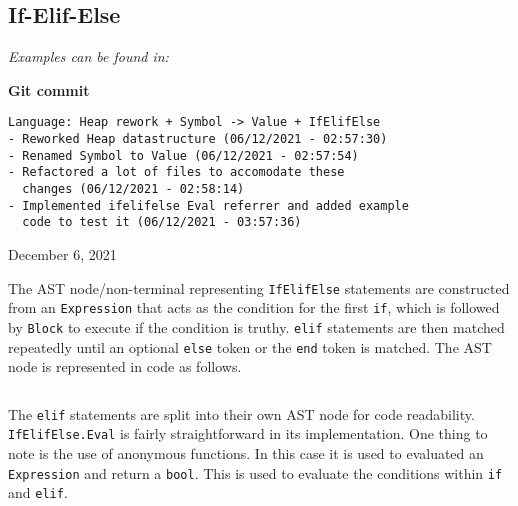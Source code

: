 \subsection{If-Elif-Else}

\textit{Examples can be found in: }

\begin{center}
    \textbf{Git commit}
    \begin{verbatim}
Language: Heap rework + Symbol -> Value + IfElifElse
- Reworked Heap datastructure (06/12/2021 - 02:57:30)
- Renamed Symbol to Value (06/12/2021 - 02:57:54)
- Refactored a lot of files to accomodate these 
  changes (06/12/2021 - 02:58:14)
- Implemented ifelifelse Eval referrer and added example
  code to test it (06/12/2021 - 03:57:36)
    \end{verbatim}
    \vspace{-1em}
    \tiny{December 6, 2021}
\end{center}

The AST node/non-terminal representing \verb|IfElifElse| statements are constructed from an \verb|Expression| that acts as the condition for the first \verb|if|, which is followed by \verb|Block| to execute if the condition is truthy. \verb|elif| statements are then matched repeatedly until an optional \verb|else| token or the \verb|end| token is matched. The AST node is represented in code as follows.

\inputminted[firstline=304, lastline=320, autogobble, breaklines, tabsize=4]{go}{../../src/parser/ast.go}

The \verb|elif| statements are split into their own AST node for code readability. \verb|IfElifElse.Eval| is fairly straightforward in its implementation. One thing to note is the use of anonymous functions. In this case it is used to evaluated an \verb|Expression| and return a \texttt{bool}. This is used to evaluate the conditions within \verb|if| and \verb|elif|.

\inputminted[firstline=801, lastline=815, autogobble, breaklines, tabsize=4]{go}{../../src/parser/eval.go}
